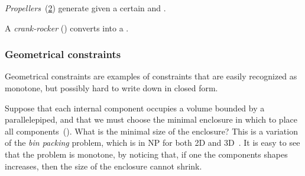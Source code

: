 \begin{figure}[h]
\begin{center}
\end{center}
\caption{\label{fig:gearbox}}
\end{figure}


\begin{example}
\emph{Propellers}~(\cref{fig:propeller}) generate 
given a certain  and .
\end{example}

\begin{figure}[h]
\begin{center}
\end{center}
\caption{\label{fig:propeller}}
\end{figure}

\begin{example}
A \emph{crank-rocker} () converts  into a .
\end{example}

\begin{figure}[h]
    \centering
\caption{\label{fig:crack}}
\end{figure}



\subsubsection{Geometrical constraints}

Geometrical constraints are examples of constraints that are easily
recognized as monotone, but possibly hard to write down in closed
form.

\begin{example}
Suppose that each internal component occupies a volume
bounded by a parallelepiped, and that we must choose the minimal enclosure
in which to place all components~(). What
is the minimal size of the enclosure? This is a variation of the \emph{bin
packing} problem, which is in NP for both 2D and 3D~\cite{lodi02two}.
It is easy to see that the problem is monotone, by noticing that,
if one the components shapes increases, then the size of the enclosure
cannot shrink.
\end{example}

